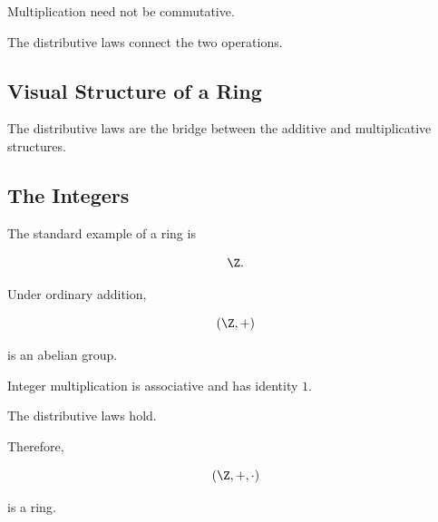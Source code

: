 Multiplication need not be commutative.

The distributive laws connect the two operations.

\subsection{Visual Structure of a Ring}
\label{subsec:visual-ring-structure}

\begin{center}
\end{center}

The distributive laws are the bridge between the additive and multiplicative
structures.

\subsection{The Integers}
\label{subsec:integers-ring-theory}

The standard example of a ring is

\[ \Z. \]

Under ordinary addition,

\[ (\Z,+) \]

is an abelian group.

Integer multiplication is associative and has identity \(1\).

The distributive laws hold.

Therefore,

\[ (\Z,+,\cdot) \]

is a ring.

